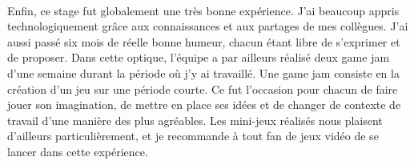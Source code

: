 \paragraph{}
Enfin, ce stage fut globalement une très bonne expérience. J'ai beaucoup appris technologiquement grâce aux connaissances et aux partages de mes collègues. J'ai aussi passé six mois de réelle bonne humeur, chacun étant libre de s'exprimer et de proposer.
Dans cette optique, l'équipe a par ailleurs réalisé deux game jam d'une semaine durant la période où j'y ai travaillé. Une game jam consiste en la création d'un jeu sur une période courte. Ce fut l'occasion pour chacun de faire jouer son imagination, de mettre en place ses idées et de changer de contexte de travail d'une manière des plus agréables. Les mini-jeux réalisés nous plaisent d'ailleurs particulièrement, et je recommande à tout fan de jeux vidéo de se lancer dans cette expérience.